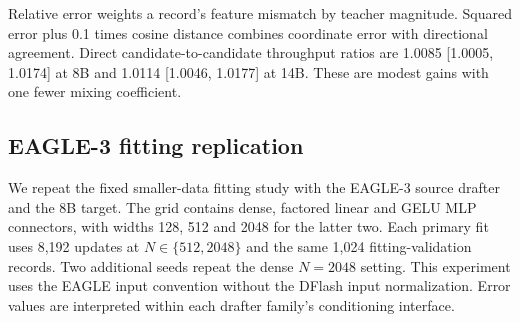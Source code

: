 \documentclass{article}
\begin{document}
\begin{table}[H]
\caption{Matched EAGLE-3 8B normalization comparison on 32 development
questions after 128 updates. Throughput ratios use source reuse.}
\label{tab:scale}
\centering\small
\setlength{\tabcolsep}{3.5pt}

\end{table}

\begin{table}[H]
\caption{DFlash objective comparison on 32 development questions.
Candidates share fitting data, update count, normalization and optimizer.
Each ratio uses the source-reuse arm of that candidate's paired run.}
\label{tab:objective}
\centering\small

\end{table}

Relative error weights a record's feature mismatch by teacher magnitude.
Squared error plus 0.1 times cosine distance combines coordinate error
with directional agreement. Direct candidate-to-candidate throughput
ratios are 1.0085 [1.0005, 1.0174] at 8B and 1.0114 [1.0046, 1.0177] at
14B. These are modest gains with one fewer mixing coefficient.

\clearpage
\subsection{EAGLE-3 fitting replication}

We repeat the fixed smaller-data fitting study with the EAGLE-3 source
drafter and the 8B target. The grid contains dense, factored linear and
GELU MLP connectors, with widths 128, 512 and 2048 for the latter two.
Each primary fit uses 8,192 updates at $N\in\{512,2048\}$ and the same
1,024 fitting-validation records. Two additional seeds repeat the dense
$N=2048$ setting. This experiment uses the EAGLE input convention without
the DFlash input normalization. Error values are interpreted within each
drafter family's conditioning interface.

\begin{table}[H]
\caption{EAGLE-3 fitting validation. End denotes the 8,192-update endpoint.
Best denotes the minimum saved fitting-validation error, with its update
count. These are development selections for seed 1729, not decoding results.
M weights counts millions of trainable mapper parameters.}
\label{tab:eagle-small-capacity}
\centering\footnotesize
\setlength{\tabcolsep}{3pt}

\end{table}
\end{document}
